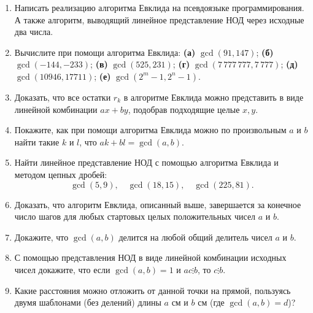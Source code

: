 \begin{enumerate}
\item Написать реализацию алгоритма Евклида на псевдоязыке программирования. А также алгоритм, выводящий линейное представление НОД через исходные два числа.
\item Вычислите при помощи алгоритма Евклида: \textbf{(а)} $\gcd(91, 147)$;
\textbf{(б)} $\gcd(-144, -233)$; \textbf{(в)} $\gcd(525, 231)$; \textbf{(г)} $\gcd(7\,777\,777, 7\,777)$;
\textbf{(д)} $\gcd(10946, 17711)$; \textbf{(е)} $\gcd(2^m-1, 2^n-1)$.

\item Доказать, что все остатки $r_k$ в алгоритме Евклида можно представить в виде линейной комбинации $ax+by$, подобрав подходящие целые $x,y$.

\item Покажите, как при помощи алгоритма Евклида можно по произвольным $a$ и $b$ 
найти такие $k$ и $l$, что $ak + bl = \gcd(a, b)$.

\item Найти линейное представление НОД с помощью алгоритма Евклида и методом цепных дробей:
$$
\gcd(5,9),\quad \gcd(18,15),\quad \gcd(225,81).
$$

\item Доказать, что алгоритм Евклида, описанный выше, завершается за конечное число шагов для любых стартовых целых положительных чисел $a$ и $b$.

\item Докажите, что $\gcd(a,b)$ делится на любой общий делитель чисел $a$ и $b$.

\item С помощью представления НОД в виде линейной комбинации исходных чисел докажите, что если $\gcd(a, b) = 1$ и $ac\vdots b$, то $c\vdots b$.

\item Какие расстояния можно отложить от данной точки на прямой, пользуясь двумя шаблонами
 (без делений) длины $a$ см и $b$ см (где $\gcd(a, b) = d$)?


\end{enumerate}





